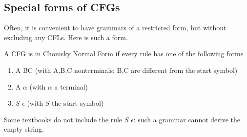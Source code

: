 \subsection{Special forms of CFGs}

Often, it is convenient to have grammars of a restricted form, but
without excluding any CFLs. Here is such a form.

\begin{definition}
A CFG is in Chomsky Normal Form if every rule has one of the following
forms
\begin{enumerate}
\item A \rpijl BC  (with A,B,C nonterminals; B,C are different from the start symbol)
\item A \rpijl $\alpha$ (with $\alpha$ a terminal)
\item $S$ \rpijl $\epsilon$ (with $S$ the start symbol)
\end{enumerate}
\end{definition}

Some textbooks do not include the rule $S$ \rpijl $\epsilon$: such a grammar
cannot derive the empty string.

